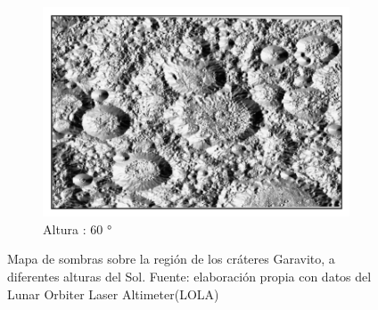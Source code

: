 \documentclass[12pt]{article}
\begin{document}
\begin{figure}[H]
\begin{subfigure}[b]{0.3\textwidth}
        \includegraphics[width=\textwidth]{images/Azimuth_45_altitude_5.png}
        \caption{Altura : 60 °}
        \label{fig:altura_5}
    \end{subfigure}
    \caption{Mapa de sombras sobre la región de los cráteres Garavito, 
    a diferentes alturas del Sol. Fuente: elaboración propia con datos 
    del Lunar Orbiter Laser Altimeter(LOLA)}
    \label{fig:Altura_azimuth}
\end{figure}
\end{document}
